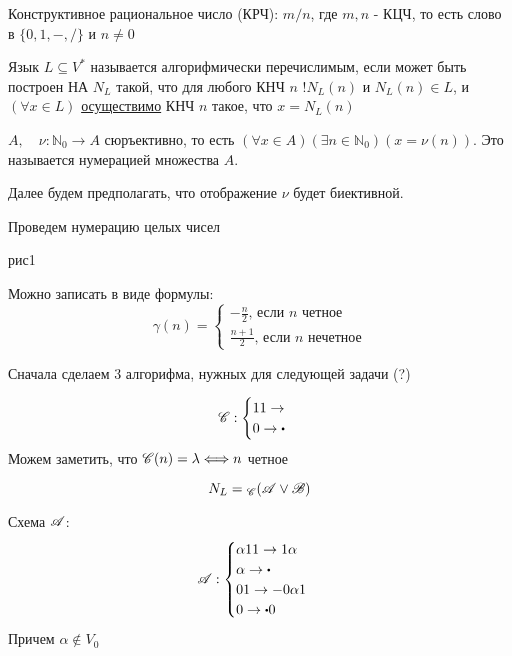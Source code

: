 \begin{definition}
Конструктивное рациональное число (КРЧ): $m / n$, где $m,n$ - КЦЧ, то есть слово в
 $\{0, 1, -, /\} $ и $n \neq 0$
\end{definition}

\begin{definition}
Язык $L \subseteq V^{*}$ называется алгорифмически перечислимым, если может быть построен НА 
$N_L$ такой, что для любого КНЧ  $n$ $!N_L(n)$ и $N_L(n) \in L$, и $(\forall x \in L)$
\underline{осуществимо} КНЧ $n$ такое, что  $x = N_L(n)$
\end{definition}

\medskip

\begin{definition}
$A, \quad \nu: \mathbb{N}_0 \to A$ сюръективно, то есть\newline
$(\forall x \in A)(\exists n \in \mathbb{N}_0)(x = \nu(n))$.
Это называется нумерацией множества $A$.
\end{definition}

Далее будем предполагать, что отображение $\nu$ будет биективной.

\medskip

Проведем нумерацию целых чисел

рис1

Можно записать в виде формулы:
\[
\gamma(n) = \begin{cases}
    -\frac{n}{2}\text{, если $n$ четное}\\
    \frac{n+1}{2}\text{, если $n$ нечетное}
\end{cases}
\] 

\medskip

Сначала сделаем 3 алгорифма, нужных для следующей задачи (?)

\[
\scr{C}: \begin{cases}
    11 \to \\
    0 \to \bigcdot
\end{cases}
\] 
Можем заметить, что $\mathscr{C}(n) = \lambda \Longleftrightarrow n$ четное

\[
    N_L = {}_{\mathscr{C}}(\mathscr{A} \lor \mathscr{B})
\]

Схема $\mathscr{A}$:
 \[
\scr{A}: \begin{cases}
    \alpha 11 \to 1\alpha\\
    \alpha \to \bigcdot\\
    01 \to -0\alpha 1\\
    0 \to \bigcdot 0\\
\end{cases}
\]
Причем $\alpha \not\in V_0$

